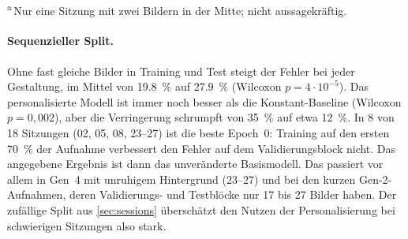 \begin{table}[htbp]
  \centering
  \caption[Testfehler pro Bildschirmregion]{Testfehler pro Bildschirmregion (\cref{sec:partition}, $r=0,15$),
           Mittelwert über die Sitzungen einer Gestaltung; in Klammern die
           Gesamtzahl der Testbilder in der Region. Basismodell
           .}
  \label{tab:region_errors}
  \footnotesize
  \setlength{\tabcolsep}{3.5pt}
  \\[1mm]
  \parbox{0.95\linewidth}{\footnotesize \textsuperscript{a}\,Nur eine Sitzung
  mit zwei Bildern in der Mitte; nicht aussagekräftig.}
\end{table}

\paragraph{Sequenzieller Split.} Ohne fast gleiche Bilder in Training und
Test steigt der Fehler bei jeder Gestaltung, im Mittel von \SI{19,8}{\percent}
auf \SI{27,9}{\percent} (Wilcoxon $p=4\cdot10^{-5}$). Das personalisierte
Modell ist immer noch besser als die Konstant-Baseline (Wilcoxon $p=0,002$),
aber die Verringerung schrumpft von \SI{35}{\percent} auf etwa
\SI{12}{\percent}. In 8 von 18 Sitzungen (02, 05, 08, 23--27) ist die beste
Epoch~0: Training auf den ersten \SI{70}{\percent} der Aufnahme verbessert den
Fehler auf dem Validierungsblock nicht. Das angegebene Ergebnis ist dann das
unveränderte Basismodell. Das passiert vor allem in Gen~4 mit unruhigem
Hintergrund (23--27) und bei den kurzen Gen-2-Aufnahmen, deren Validierungs-
und Testblöcke nur 17 bis 27 Bilder haben. Der zufällige Split aus
\cref{sec:sessions} überschätzt den Nutzen der Personalisierung bei
schwierigen Sitzungen also stark.

